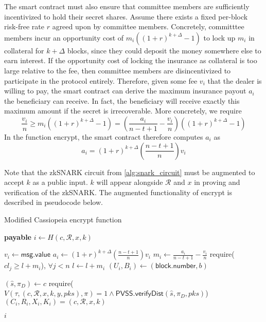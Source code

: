 The smart contract must also ensure that committee members are sufficiently incentivized to hold their secret shares.
Assume there exists a fixed per-block risk-free rate $r$ agreed upon by committee members.
Concretely, committtee members incur an opportunity cost of $m_i((1 + r)^{k + \Delta} - 1)$ to lock up $m_i$ in collateral for $k + \Delta$ blocks, since they could deposit the money somewhere else to earn interest.
If the opportunity cost of locking the insurance as collateral is too large relative to the fee, then committee members are disincentivized to participate in the protocol entirely.
Therefore, given some fee $v_i$ that the dealer is willing to pay, the smart contract can derive the maximum insurance payout $a_i$ the beneficiary can receive.
In fact, the beneficiary will receive exactly this maximum amount if the secret is irrecoverable.
More concretely, we require
\begin{equation}\label{fee_collateral_ineq}
    \frac{v_i}{n} \geq m_i((1 + r)^{k + \Delta} - 1) = (\frac{a_i}{n - t + 1} - \frac{v_i}{n})((1+r)^{k + \Delta} - 1)
\end{equation}
In the function \textsf{encrypt}, the smart contract therefore computes $a_i$ as
\begin{equation}\label{fee_collateral_eq}
    a_i = (1+r)^{k + \Delta}(\frac{n - t + 1}{n})v_i
\end{equation}

Note that the zkSNARK circuit from \ref{alg:snark_circuit} must be augmented to accept $k$ as a public input.
$k$ will appear alongside $\mathcal{R}$ and $x$ in proving and verification of the zkSNARK.
The augmented functionality of \textsf{encrypt} is described in pseudocode below.

\begin{algorithm}[H]
\caption{Modified Cassiopeia \textsf{encrypt} function}
    \begin{algorithmic}[1]
             \textbf{payable}
                \State $i \gets H(c, \mathcal{R}, x, k)$

                \State $v_i \gets \textsf{msg.value}$
                \State $a_i \gets (1+r)^{k + \Delta}(\frac{n - t + 1}{n})v_i$
                \State $m_i \gets \frac{a_i}{n - t + 1} - \frac{v_i}{n}$
                \State require($cl_j \geq l + m_i$), $\forall j < n$
                \State $l \gets l + m_i$
                \State $(U_i, B_i) \gets (\textsf{block.number}, b)$

                \State $(\hat{s}, \pi_D) \gets c$
                \State require($V(\tau, (c, \mathcal{R}, x, k, y, pks), \pi) = 1 \land \textsf{PVSS.verifyDist}(\hat{s}, \pi_D, pks)$)
                \State $(C_i, R_i, X_i, K_i) = (c, \mathcal{R}, x, k)$

                \State \Return $i$
            \EndFunction
    \end{algorithmic}
\end{algorithm}

